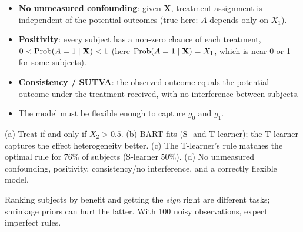 \documentclass[11pt]{article}
\begin{document}
\begin{itemize}
\item \textbf{No unmeasured confounding}: given $\mathbf X$, treatment assignment is independent of the potential outcomes (true here: $A$ depends only on $X_1$).
\item \textbf{Positivity}: every subject has a non-zero chance of each treatment, $0<\mathrm{Prob}(A=1\mid\mathbf X)<1$ (here $\mathrm{Prob}(A=1\mid\mathbf X)=X_1$, which is near 0 or 1 for some subjects).
\item \textbf{Consistency / SUTVA}: the observed outcome equals the potential outcome under the treatment received, with no interference between subjects.
\item The model must be flexible enough to capture $g_0$ and $g_1$.
\end{itemize}

\begin{answer}
(a) Treat if and only if $X_2>0.5$. (b) BART fits (S- and T-learner); the T-learner captures the effect heterogeneity better. (c) The T-learner's rule matches the optimal rule for 76\% of subjects (S-learner 50\%). (d) No unmeasured confounding, positivity, consistency/no interference, and a correctly flexible model.
\end{answer}

\begin{takeaway}
Ranking subjects by benefit and getting the \emph{sign} right are different tasks; shrinkage priors can hurt the latter. With 100 noisy observations, expect imperfect rules.
\end{takeaway}

\end{document}
